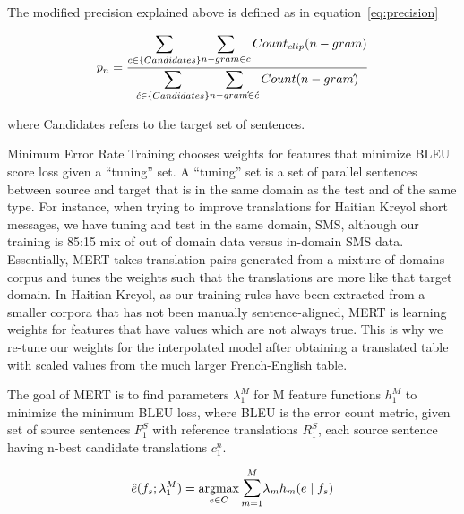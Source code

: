 The modified precision explained above is defined as in equation~\eqref{eq:precision}

\begin{equation} \label{eq:precision}
	p_{n} = \frac{\mathlarger{\sum\limits_{c \in \{Candidates\}}} \mathlarger{\sum\limits_{n-gram \in c}Count_{clip}(n-gram)}}
			{\mathlarger{\sum\limits_{\acute{c} \in \{Candidates\}}} \mathlarger{\sum\limits_{n-gram\acute{} \in \acute{c}}Count(n-gram\acute{})}}
\end{equation}

where Candidates refers to the target set of sentences. 

Minimum Error Rate Training chooses weights for features that minimize BLEU score loss given a ``tuning'' set. A ``tuning'' set is a set of parallel sentences between source and target that is in the same domain as the test and of the same type. For instance, when trying to improve translations for Haitian Kreyol short messages, we have tuning and test in the same domain, SMS, although our training is 85:15 mix of out of domain data versus in-domain SMS data. Essentially, MERT takes translation pairs generated from a mixture of domains corpus and tunes the weights such that the translations are more like that target domain. In Haitian Kreyol, as our training rules have been extracted from a smaller corpora that has not been manually sentence-aligned, MERT is learning weights for features that have values which are not always true. This is why we re-tune our weights for the interpolated model after obtaining a translated table with scaled values from the much larger French-English table. 


The goal of MERT is to find parameters $\lambda_{1}^{M}$ for M feature functions $h_{1}^{M}$ to minimize the minimum BLEU loss, where BLEU is the error count metric, given set of source sentences $F_{1}^{S}$ with reference translations $R_{1}^{S}$, each source sentence having n-best candidate translations $c_{1}^{n}$. 


\begin{equation} \label{eq:maximization_mert}
	\hat{e}(f_{s};\lambda_{1}^M) = \argmax_{e \in C} \mathlarger\sum\limits_{m=1}^{M} \lambda_{m}h_{m}(e \mid f_{s})
\end{equation}



